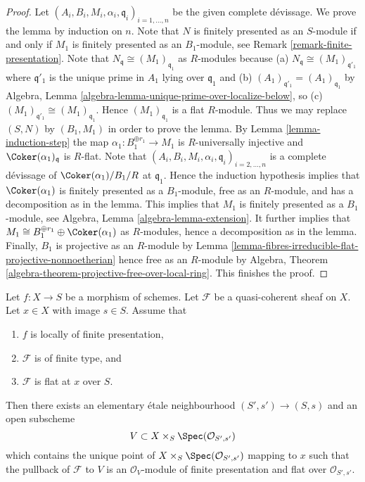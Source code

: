 \begin{proof}
Let $(A_i, B_i, M_i, \alpha_i, \mathfrak q_i)_{i = 1, \ldots, n}$
be the given complete d\'evissage. We prove the lemma by induction on $n$.
Note that $N$ is finitely presented as an $S$-module if and only if
$M_1$ is finitely presented as an $B_1$-module, see
Remark \ref{remark-finite-presentation}.
Note that $N_{\mathfrak q} \cong (M_1)_{\mathfrak q_1}$ as $R$-modules
because (a) $N_{\mathfrak q} \cong (M_1)_{\mathfrak q'_1}$ where
$\mathfrak q'_1$ is the unique prime in $A_1$ lying over $\mathfrak q_1$
and (b) $(A_1)_{\mathfrak q'_1} = (A_1)_{\mathfrak q_1}$ by
Algebra, Lemma \ref{algebra-lemma-unique-prime-over-localize-below},
so (c) $(M_1)_{\mathfrak q'_1} \cong (M_1)_{\mathfrak q_1}$.
Hence $(M_1)_{\mathfrak q_1}$ is a flat $R$-module. Thus we may replace
$(S, N)$ by $(B_1, M_1)$ in order to prove the lemma. By
Lemma \ref{lemma-induction-step}
the map $\alpha_1 : B_1^{\oplus r_1} \to M_1$ is $R$-universally injective
and $\Coker(\alpha_1)_{\mathfrak q}$ is $R$-flat.
Note that $(A_i, B_i, M_i, \alpha_i, \mathfrak q_i)_{i = 2, \ldots, n}$
is a complete d\'evissage of $\Coker(\alpha_1)/B_1/R$ at
$\mathfrak q_1$. Hence the induction hypothesis
implies that $\Coker(\alpha_1)$ is finitely presented as a
$B_1$-module, free as an $R$-module, and has a decomposition as in the lemma.
This implies that $M_1$ is finitely presented as a $B_1$-module, see
Algebra, Lemma \ref{algebra-lemma-extension}.
It further implies that
$M_1 \cong B_1^{\oplus r_1} \oplus \Coker(\alpha_1)$
as $R$-modules, hence a decomposition as in the lemma.
Finally, $B_1$ is projective as an $R$-module by
Lemma \ref{lemma-fibres-irreducible-flat-projective-nonnoetherian}
hence free as an $R$-module by
Algebra, Theorem \ref{algebra-theorem-projective-free-over-local-ring}.
This finishes the proof.
\end{proof}

\begin{proposition}
\label{proposition-finite-type-flat-at-point}
Let $f : X \to S$ be a morphism of schemes.
Let $\mathcal{F}$ be a quasi-coherent sheaf on $X$.
Let $x \in X$ with image $s \in S$.
Assume that
\begin{enumerate}
\item $f$ is locally of finite presentation,
\item $\mathcal{F}$ is of finite type, and
\item $\mathcal{F}$ is flat at $x$ over $S$.
\end{enumerate}
Then there exists an elementary \'etale neighbourhood $(S', s') \to (S, s)$
and an open subscheme
$$
V \subset X \times_S \Spec(\mathcal{O}_{S', s'})
$$
which contains the unique point of
$X \times_S \Spec(\mathcal{O}_{S', s'})$ mapping to $x$
such that the pullback of $\mathcal{F}$ to $V$ is an $\mathcal{O}_V$-module
of finite presentation and flat over $\mathcal{O}_{S', s'}$.
\end{proposition}

